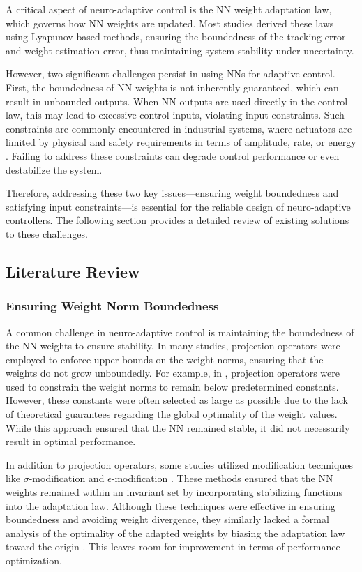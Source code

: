 \documentclass[journal]{IEEEtran}
\begin{document}
A critical aspect of neuro-adaptive control is the NN weight adaptation law, which governs how NN weights are updated. 
Most studies derived these laws using Lyapunov-based methods, ensuring the boundedness of the tracking error and weight estimation error, thus maintaining system stability under uncertainty.

However, two significant challenges persist in using NNs for adaptive control. 
First, the boundedness of NN weights is not inherently guaranteed, which can result in unbounded outputs. 
When NN outputs are used directly in the control law, this may lead to excessive control inputs, violating input constraints. 
Such constraints are commonly encountered in industrial systems, where actuators are limited by physical and safety requirements in terms of amplitude, rate, or energy \cite{Esfandiari:2021aa}. 
Failing to address these constraints can degrade control performance or even destabilize the system.

Therefore, addressing these two key issues—ensuring weight boundedness and satisfying input constraints—is essential for the reliable design of neuro-adaptive controllers. 
The following section provides a detailed review of existing solutions to these challenges.

\subsection{Literature Review}

\subsubsection{Ensuring Weight Norm Boundedness}

A common challenge in neuro-adaptive control is maintaining the boundedness of the NN weights to ensure stability. 
In many studies, projection operators were employed to enforce upper bounds on the weight norms, ensuring that the weights do not grow unboundedly. 
For example, in \cite{Zhou:2023aa,Griffis:2023aa,Patil:2022aa}, projection operators were used to constrain the weight norms to remain below predetermined constants. 
However, these constants were often selected as large as possible due to the lack of theoretical guarantees regarding the global optimality of the weight values. 
While this approach ensured that the NN remained stable, it did not necessarily result in optimal performance.

In addition to projection operators, some studies utilized modification techniques like $\sigma$-modification \cite{Ge:2002aa} and $\epsilon$-modification \cite{Esfandiari:2015aa,Gao:2006aa}. 
These methods ensured that the NN weights remained within an invariant set by incorporating stabilizing functions into the adaptation law. 
Although these techniques were effective in ensuring boundedness and avoiding weight divergence, they similarly lacked a formal analysis of the optimality of the adapted weights by biasing the adaptation law toward the origin \cite{Ryu:2024aa}.
This leaves room for improvement in terms of performance optimization.
\end{document}

